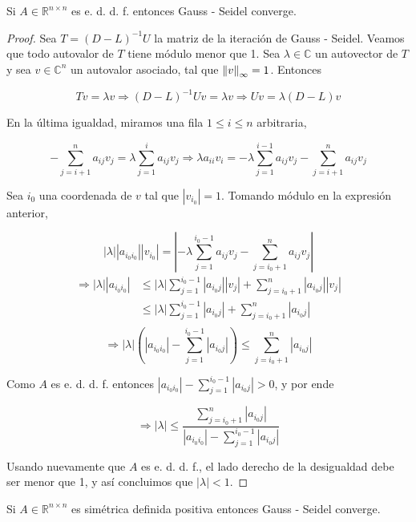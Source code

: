 \begin{propo}
Si $A \in \mathbb{R}^{n \times n}$ es e. d. d. f. entonces Gauss - Seidel converge.

\begin{proof}
Sea $T = (D - L)^{-1} U$ la matriz de la iteración de Gauss - Seidel. Veamos que todo autovalor de $T$ tiene módulo menor que 1. Sea $\lambda \in \mathbb{C}$ un autovector de $T$ y sea $v \in \mathbb{C}^n$ un autovalor asociado, tal que $\left\lVert v\right\rVert_{\infty} = 1$. Entonces 

\[Tv = \lambda v \Rightarrow (D - L)^{-1}Uv = \lambda v \Rightarrow Uv = \lambda(D - L)v\]

En la última igualdad, miramos una fila $1 \leq i \leq n$ arbitraria,

\[-\sum_{j = i + 1}^n a_{ij}v_j = \lambda \sum_{j = 1}^i a_{ij} v_j \Rightarrow \lambda a_{ii}v_i = - \lambda \sum_{j = 1}^{i - 1} a_{ij} v_j - \sum_{j = i + 1}^n a_{ij} v_j \]

Sea $i_0$ una coordenada de $v$ tal que $|v_{i_0}| = 1$. Tomando módulo en la expresión anterior,

\[|\lambda| |a_{i_0i_0}| |v_{i_0}| = \left| - \lambda \sum_{j = 1}^{i_0 - 1} a_{ij} v_j - \sum_{j = i_0 + 1}^n a_{ij} v_j \right|\]
\begin{align*}
\Rightarrow |\lambda| |a_{i_0i_0}| & \leq |\lambda| \sum_{j = 1}^{i_0 - 1}|a_{i_0j}| |v_j| + \sum_{j = i_0 + 1}^n |a_{i_0j}| |v_j|\\
& \leq |\lambda| \sum_{j = 1}^{i_0 - 1}|a_{i_0j}| + \sum_{j = i_0 + 1}^n |a_{i_0j}|\\
\end{align*}
\[\Rightarrow |\lambda| \left(|a_{i_0i_0}| - \sum_{j = 1}^{i_0 - 1} |a_{i_0j}|\right) \leq  \sum_{j = i_0 + 1}^n |a_{i_0j}|\]

Como $A$ es e. d. d. f. entonces $|a_{i_0i_0}| - \sum_{j = 1}^{i_0 - 1} |a_{i_0j}| > 0$, y por ende

\[\Rightarrow |\lambda| \leq \frac{\sum_{j = i_0 + 1}^n |a_{i_0j}|}{|a_{i_0i_0}| - \sum_{j = 1}^{i_0 - 1} |a_{i_0j}|}\]

Usando nuevamente que $A$ es e. d. d. f., el lado derecho de la desigualdad debe ser menor que 1, y así concluimos que $|\lambda| < 1$.

\end{proof}
\end{propo}

\begin{propo}
Si $A \in \mathbb{R}^{n \times n}$ es simétrica definida positiva entonces Gauss - Seidel converge.
\end{propo}

